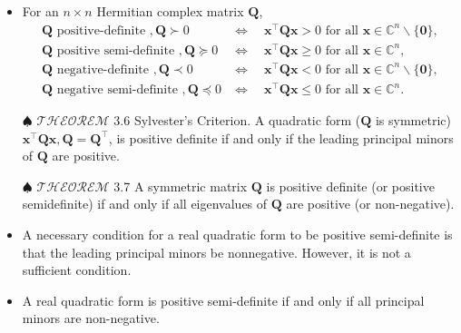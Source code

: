 \begin{itemize}
	\item For an \(n \times n\) Hermitian complex matrix \(\boldsymbol{Q}\),
	\begin{equation*}
		\begin{aligned}
			\boldsymbol{Q} \text{ positive-definite }, \boldsymbol{Q} \succ 0 &  \Longleftrightarrow \quad
			\boldsymbol{x}^{\top} \boldsymbol{Q} \boldsymbol{x}>0 \text { for all } \boldsymbol{x} \in \mathbb{C}^n \backslash\{\boldsymbol{0}\}, \\
			\boldsymbol{Q}  \text{ positive semi-definite }, \boldsymbol{Q}  \succeq 0 & \Longleftrightarrow \quad \boldsymbol{x}^{\top} \boldsymbol{Q} \boldsymbol{x} \geq 0 \text{ for all } \boldsymbol{x} \in \mathbb{C}^n, \\
			\boldsymbol{Q} \text { negative-definite }, \boldsymbol{Q}  \prec 0 & \Longleftrightarrow \quad
			\boldsymbol{x}^{\top} \boldsymbol{Q} \boldsymbol{x}<0 \text { for all } \boldsymbol{x} \in \mathbb{C}^n \backslash\{\boldsymbol{0}\}, \\
			\boldsymbol{Q} \text { negative semi-definite }, \boldsymbol{Q}  \preceq 0 &\Longleftrightarrow \quad \boldsymbol{x}^{\top} \boldsymbol{Q} \boldsymbol{x} \leq 0 \text { for all } \boldsymbol{x} \in \mathbb{C}^n.
		\end{aligned}
	\end{equation*}
	
	
	\item[\(\spadesuit\)] \(\mathscr{THEOREM}\) 3.6 Sylvester's Criterion. A quadratic form (\(\boldsymbol{Q}\) is symmetric) \(\boldsymbol{x}^{\top} \boldsymbol{Q} \boldsymbol{x}, \boldsymbol{Q}=\boldsymbol{Q}^{\top}\), is positive definite if and only if the leading principal minors of \(\boldsymbol{Q}\) are positive.

	\item[\(\spadesuit\)] \(\mathscr{THEOREM}\) 3.7  A symmetric matrix \(\boldsymbol{Q}\) is positive definite (or positive semidefinite) if and only if all eigenvalues of \(\boldsymbol{Q}\) are positive (or non-negative).

	\item A necessary condition for a real quadratic form to be positive semi-definite is that the leading principal minors be nonnegative. However, it is not a sufficient condition.
	
	\item A real quadratic form is positive semi-definite if and only if all principal minors are non-negative.
	
\end{itemize}



